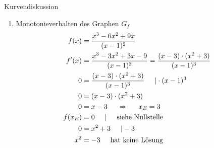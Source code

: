 \begin{bsp}{Kurvendiskussion}{}
\begin{enumerate}
\begin{equation*}
\begin{split}
         x_1 &= 0\\
         x_{2/3} &= \dfrac{6\pm \sqrt{36 -4\cdot 1 \cdot 9}}{2 \cdot 1}\\
         &= \dfrac{6\pm \sqrt{36-36}}{2}\\
         &= \dfrac{6}{2} = 3
    \end{split}
\end{equation*}
Damit ergibt sich eine einfache Nullstelle bei $x_1= 0$ und eine doppelte Nullstelle bei $x_{2/3} = 3$
\begin{equation*}
    \begin{split}
        f(0) &= \dfrac{0^3-6\cdot0^2+9\cdot 0}{(0-1)^2}\\
         &= \dfrac{0}{1} = 0
    \end{split}
\end{equation*}
Der Schnittpunkt mit der y-Achse ergibt sich damit bei $SP_{\text{y}}(0|0)$.
 \item Monotonieverhalten des Graphen $G_f$
 \begin{equation*}
    \begin{split}
        f(x) &= \dfrac{x^3-6x^2+9x}{(x-1)^2}\\
         f'(x) &= \dfrac{x^3-3x^2+3x-9}{(x-1)^3} = \dfrac{(x-3)\cdot (x^2+3)}{(x-1)^3}\\
         0 &= \dfrac{(x-3)\cdot (x^2+3)}{(x-1)^3} \hspace{0.5cm} | \cdot (x-1)^3\\
         0&=( x-3)\cdot (x^2+3)\\
         0 &= x-3 \hspace{0.5cm}\Rightarrow\hspace{0.5cm} x_{E} = 3\\
         f(x_{E}) &= 0 \hspace{0.5cm} | \hspace{0.5cm}\text{siehe Nullstelle}\\
         0&= x^2+3 \hspace{0.5cm} | -3 \\
         x^2&= -3 \hspace{0.5cm}\text{hat keine Lösung}
    \end{split}
\end{equation*}


\end{enumerate}
\end{bsp}
